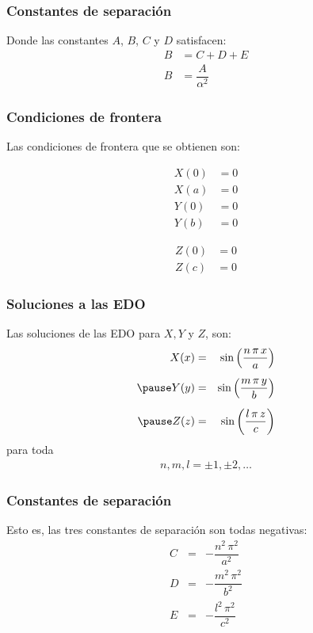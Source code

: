 \documentclass[12pt]{beamer}
\begin{document}
\begin{frame}
\frametitle{Constantes de separación}
Donde las constantes $A$, $B$, $C$ y $D$ satisfacen:
\begin{align*}
B &= C + D + E \\[0.5em]
B &= \dfrac{A}{\alpha^{2}}
\end{align*}
\end{frame}
\begin{frame}
\frametitle{Condiciones de frontera}
Las condiciones de frontera que se obtienen son:
\\
\begin{minipage}[t]{0.4\textwidth}
\begin{align}
X (0) &= 0 \label{eq:ecuacion_02_228} \\
X (a) &= 0 \label{eq:ecuacion_02_229} \\
Y (0) &= 0 \label{eq:ecuacion_02_230} \\
Y (b) &= 0 \label{eq:ecuacion_02_231}
\end{align}
\end{minipage}
\hspace{1cm}
\begin{minipage}[t]{0.4\textwidth}
\begin{align}
Z (0) &= 0 \label{eq:ecuacion_02_232} \\
Z (c) &= 0 \label{eq:ecuacion_02_233}
\end{align}
\end{minipage}
\end{frame}
\begin{frame}
\frametitle{Soluciones a las EDO}
Las soluciones de las EDO para $X, Y$ y $Z$, son:
\begin{eqnarray}
X (x) &=& \sin \left( \dfrac{n \, \pi \, x}{a} \right) \label{eq:ecuacion_02_234} \\[0.5em] \pause
Y (y) &=& \sin \left( \dfrac{m \, \pi \, y}{b} \right) \label{eq:ecuacion_02_235} \\[0.5em] \pause
Z (z) &=& \sin \left( \dfrac{l \, \pi \, z}{c} \right) \label{eq:ecuacion_02_236}
\end{eqnarray}
para toda
\begin{align*}
n, m, l = \pm 1, \pm 2, \ldots
\end{align*}
\end{frame}
\begin{frame}
\frametitle{Constantes de separación}
Esto es, las tres constantes de separación son todas negativas:
\begin{eqnarray*}
C &=& - \dfrac{n^{2} \, \pi^{2}}{a^{2}} \\[0.5em]
D &=& - \dfrac{m^{2} \, \pi^{2}}{b^{2}} \\[0.5em]
E &=& - \dfrac{l^{2} \, \pi^{2}}{c^{2}}
\end{eqnarray*}
\end{frame}
\end{document}
